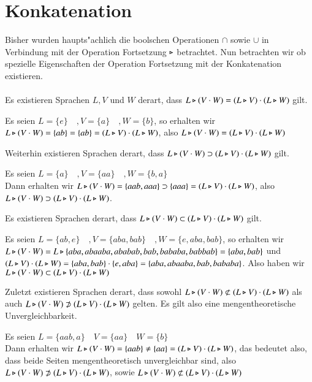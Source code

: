 \section{Konkatenation}
Bisher wurden haupts"achlich die boolschen Operationen $\cap$ sowie $\cup$ in Verbindung mit der Operation Fortsetzung $\triangleright$ betrachtet.
Nun betrachten wir ob spezielle Eigenschaften der Operation Fortsetzung mit der Konkatenation existieren.\\\\
Es existieren Sprachen $L,V$ und $W$ derart, dass $L\triangleright (V\cdot W) = (L\triangleright V) \cdot (L\triangleright W)$ gilt.
\begin{beispiel}
Es seien  $L=\{e\}\quad ,V=\{a\}\quad ,W=\{b\} $, so erhalten wir \\
$L\triangleright (V\cdot W) = \{ ab\} =  \{ab\} = (L\triangleright V) \cdot (L\triangleright W)$, also $L\triangleright (V\cdot W) = (L\triangleright V) \cdot (L\triangleright W)$
\end{beispiel}
Weiterhin existieren Sprachen derart, dass $L\triangleright (V\cdot W) \supset (L\triangleright V) \cdot (L\triangleright W)$ gilt.
\begin{beispiel}
Es seien $L=\{a\}\quad ,V=\{aa\}\quad ,W=\{b,a\} $\\
Dann erhalten wir $L\triangleright (V\cdot W) = \{aab,aaa\} \supset  \{aaa\} = (L\triangleright V) \cdot (L\triangleright W)$, also $L\triangleright (V\cdot W) \supset (L\triangleright V) \cdot (L\triangleright W)$.
\end{beispiel}
Es existieren Sprachen derart, dass $L\triangleright (V\cdot W) \subset (L\triangleright V)\cdot (L\triangleright W)$ gilt.
\begin{beispiel}
Es seien  $L=\{ab,e\}\quad ,V=\{aba,bab\}\quad ,W=\{e,aba,bab\} $, so erhalten wir \\
$L\triangleright (V\cdot W) = L \triangleright \{aba,abaaba,ababab,bab,bababa,babbab\} = \{ aba,bab\}$ und $(L\triangleright V)\cdot (L\triangleright W) = \{aba,bab\} \cdot \{e,aba\} = \{aba,abaaba,bab,bababa\}$. 
Also haben wir $L\triangleright (V\cdot W) \subset (L\triangleright V)\cdot (L\triangleright W)$
\end{beispiel}
Zuletzt existieren Sprachen derart, dass sowohl $L\triangleright (V\cdot W) \not\subset (L\triangleright V)\cdot (L\triangleright W)$ als auch $L\triangleright (V\cdot W) \not\supset (L\triangleright V)\cdot (L\triangleright W)$ gelten. Es gilt also eine mengentheoretische Unvergleichbarkeit.
\begin{beispiel}
Es seien $L=\{aab,a\}\quad V=\{aa\}\quad W=\{b\}$\\
Dann erhalten wir $L\triangleright (V\cdot W) = \{aab\} \neq \{aa\} = (L\triangleright V) \cdot (L\triangleright W)$, das bedeutet also, dass beide Seiten mengentheoretisch unvergleichbar sind, also 
$L\triangleright (V\cdot W) \not\supset (L\triangleright V) \cdot (L\triangleright W)$, sowie $L\triangleright (V\cdot W) \not\subset (L\triangleright V) \cdot (L\triangleright W)$
\end{beispiel}
